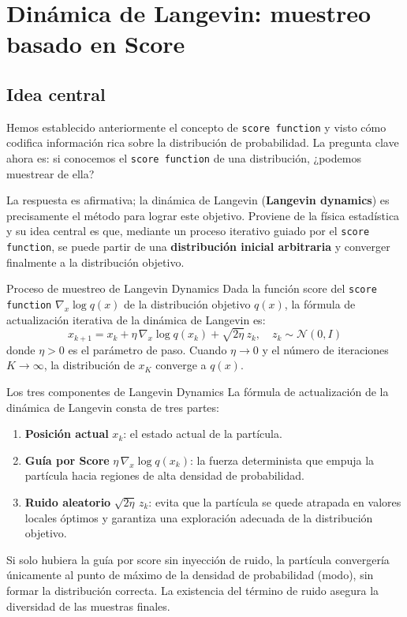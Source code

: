 \section{Dinámica de Langevin: muestreo basado en Score}

\subsection{Idea central}

Hemos establecido anteriormente el concepto de \texttt{score function} y visto cómo codifica información rica sobre la distribución de probabilidad. La pregunta clave ahora es: si conocemos el \texttt{score function} de una distribución, ¿podemos muestrear de ella?

La respuesta es afirmativa; la dinámica de Langevin (\textbf{Langevin dynamics}) es precisamente el método para lograr este objetivo. Proviene de la física estadística y su idea central es que, mediante un proceso iterativo guiado por el \texttt{score function}, se puede partir de una \textbf{distribución inicial arbitraria} y converger finalmente a la distribución objetivo.

\begin{importantbox}{Proceso de muestreo de Langevin Dynamics}
Dada la función score del \texttt{score function} $\nabla_x \log q(x)$ de la distribución objetivo $q(x)$, la fórmula de actualización iterativa de la dinámica de Langevin es:
$$x_{k+1} = x_k + \eta\, \nabla_x \log q(x_k) + \sqrt{2\eta}\, z_k, \quad z_k \sim \mathcal{N}(0, I)$$
donde $\eta > 0$ es el parámetro de paso. Cuando $\eta \to 0$ y el número de iteraciones $K \to \infty$, la distribución de $x_K$ converge a $q(x)$.
\end{importantbox}

\begin{knowledgebox}{Los tres componentes de Langevin Dynamics}
La fórmula de actualización de la dinámica de Langevin consta de tres partes:
\begin{enumerate}
    \item \textbf{Posición actual} $x_k$: el estado actual de la partícula.
    \item \textbf{Guía por Score} $\eta\, \nabla_x \log q(x_k)$: la fuerza determinista que empuja la partícula hacia regiones de alta densidad de probabilidad.
    \item \textbf{Ruido aleatorio} $\sqrt{2\eta}\, z_k$: evita que la partícula se quede atrapada en valores locales óptimos y garantiza una exploración adecuada de la distribución objetivo.
\end{enumerate}
Si solo hubiera la guía por score sin inyección de ruido, la partícula convergería únicamente al punto de máximo de la densidad de probabilidad (modo), sin formar la distribución correcta. La existencia del término de ruido asegura la diversidad de las muestras finales.
\end{knowledgebox}

